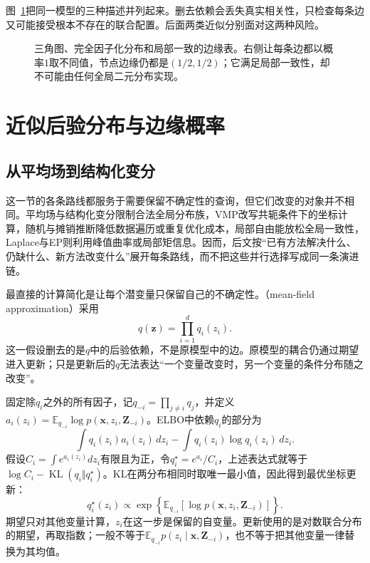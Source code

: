 图~\ref{fig:pgm-variational-triangle}把同一模型的三种描述并列起来。删去依赖会丢失真实相关性，只检查每条边又可能接受根本不存在的联合配置。后面两类近似分别面对这两种风险。
\begin{figure}[htbp]
  \centering
  
  \caption{三角图、完全因子化分布和局部一致的边缘表。右侧让每条边都以概率$1$取不同值，节点边缘仍都是$(1/2,1/2)$；它满足局部一致性，却不可能由任何全局二元分布实现。}
  \label{fig:pgm-variational-triangle}
\end{figure}

\section{近似后验分布与边缘概率}
\label{sec:pgm-variational-posterior}
\label{sec:pgm-variational-mean-field}

\subsection{从平均场到结构化变分}
\label{sec:pgm-variational-mean-field-structured}
\label{sec:pgm-variational-coordinate}

这一节的各条路线都服务于需要保留不确定性的查询，但它们改变的对象并不相同。平均场与结构化变分限制合法全局分布族，VMP改写共轭条件下的坐标计算，随机与摊销推断降低数据遍历或重复优化成本，局部自由能放松全局一致性，Laplace与EP则利用峰值曲率或局部矩信息。因而，后文按“已有方法解决什么、仍缺什么、新方法改变什么”展开每条路线，而不把这些并行选择写成同一条演进链。

最直接的计算简化是让每个潜变量只保留自己的不确定性。（mean-field approximation）采用
\[
  q(\bm{z})=\prod_{i=1}^{d}q_i(z_i).
\]
这一假设删去的是$q$中的后验依赖，不是原模型中的边。原模型的耦合仍通过期望进入更新；只是更新后的$q$无法表达“一个变量改变时，另一个变量的条件分布随之改变”。

固定除$q_i$之外的所有因子，记$q_{-i}=\prod_{j\ne i}q_j$，并定义$a_i(z_i)=\mathbb E_{q_{-i}}\log p(\bm{x},z_i,\bm{Z}_{-i})$。ELBO中依赖$q_i$的部分为
\[
  \int q_i(z_i)a_i(z_i)\,dz_i-\int q_i(z_i)\log q_i(z_i)\,dz_i.
\]
假设$C_i=\int e^{a_i(z_i)}dz_i$有限且为正，令$q_i^\star=e^{a_i}/C_i$，上述表达式就等于$\log C_i-\operatorname{KL}(q_i\Vert q_i^\star)$。KL在两分布相同时取唯一最小值，因此得到最优坐标更新：
\begin{equation}
  q_i^\star(z_i)
    \propto\exp\left\{\mathbb E_{q_{-i}}
      [\log p(\bm{x},z_i,\bm{Z}_{-i})]\right\}.
  \label{eq:pgm-variational-coordinate}
\end{equation}
期望只对其他变量计算，$z_i$在这一步是保留的自变量。更新使用的是对数联合分布的期望，再取指数；一般不等于$\mathbb E_{q_{-i}}p(z_i\mid\bm{x},\bm{Z}_{-i})$，也不等于把其他变量一律替换为其均值。


